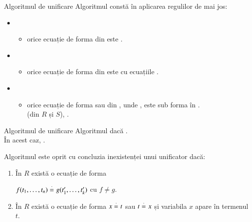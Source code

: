 \documentclass[xcolor=pdftex,romanian,colorlinks]{beamer}
\begin{document}
\begin{frame}{Algoritmul de unificare}
Algoritmul constă în aplicarea regulilor de mai jos:
\begin{itemize}
	\vspace{.2cm}  
	\item {}
		\begin{itemize}
			\item orice ecuație de forma  din  este .
		\end{itemize}
	\vspace{.2cm}  
	\item {}
		\begin{itemize}
			\item orice ecuație de forma  din  este  cu ecuațiile .
		\end{itemize}
	\vspace{.2cm}  
	\item {}
	\begin{itemize}
			\item orice ecuație de forma  sau  din , unde , este  sub forma  în . \\ (din $R$ și $S$), .	
		\end{itemize}
\end{itemize}
\end{frame}

\begin{frame}{Algoritmul de unificare}
Algoritmul  dacă .\\
 În acest caz, .

\vspace{.5cm}  
Algoritmul este oprit cu concluzia {\color{False} inexistenței unui unificator} dacă:
\begin{enumerate}
	\item În $R$ există o ecuație de forma
	\begin{center}
	{\color{False}$f(t_1,\ldots,t_n) \stackrel{\cdot}{=}_{} g(t_1',\ldots,t_k')$} cu {\color{False}$f \neq g$}.
	\end{center}
	\item În $R$ există o ecuație de forma {\color{False}$x \stackrel{\cdot}{=}_{} t$} sau {\color{False}$t \stackrel{\cdot}{=}_{} x$} și {\color{False}variabila $x$ apare în termenul $t$}.
\end{enumerate}
\end{frame}
\end{document}
